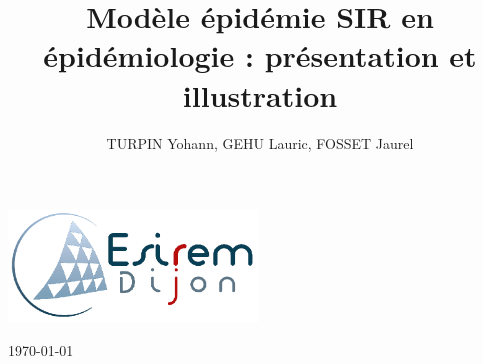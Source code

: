 \documentclass[11pt]{report}
\title{Modèle épidémie SIR en épidémiologie : présentation et illustration}
\author{TURPIN Yohann, GEHU Lauric, FOSSET Jaurel}
\begin{document}
    \cfoot{\thepage}
    
    \makeatletter
    \begin{titlepage}
        \reversemarginpar\marginpar
        {
            \vspace{-86pt}
            \hspace*{25pt}
            \includegraphics[height=3cm]{Logo_Esirem.png}%
        }
        
        {\centering
            \vspace{3cm}
            \par\vspace{5cm}
            {\scshape\huge\textbf{\hspace{2cm}\@title}} \par\vspace{6cm}
            
            {\LARGE
            \begin{flushright}
                    \item \@author
                    \item \today
            \end{flushright}
            }
        }
    \end{titlepage}
    \makeatother


    \null
    \thispagestyle{empty}
    \addtocounter{page}{-1}
    \newpage

    
    \tableofcontents
    \newpage

    \setlength{\abovedisplayskip}{6pt}
    \setlength{\belowdisplayskip}{6pt}


    
    
    
    
    
    


    \listoffigures
    \listoftables
    \renewcommand{\bibname}{Bibliography}
    
    


    
\end{document}

